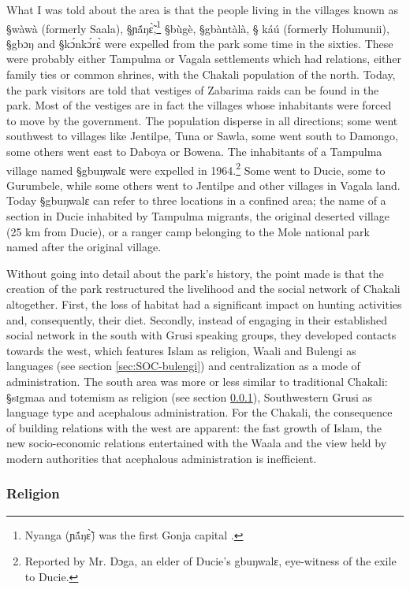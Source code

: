 What I was told about the area is that the people living in the villages
known as
{\S wàwà} (formerly Saala), {\S ɲã́ŋɛ̃̀},\footnote{Nyanga ({\F ɲã́ŋɛ̃̀})  was
the first Gonja capital \cite[121]{Wilk89}.} {\S bùgè}, {\S gbàntàlà},  {\S
káú} (formerly Holumunii), {\S gbɔŋ} and {\S kɔ́nkɔ́rɛ̀} were expelled from the
park some time  in the  sixties. These were probably either Tampulma
or Vagala settlements which had relations, either family ties or common
shrines, 
with the Chakali population of the north. Today, the park visitors  are
told that vestiges of Zabarima raids can be found in the park. Most of the
vestiges are in fact  the villages whose inhabitants were forced to move by the
 government. The population  disperse in all
directions; some went southwest
to villages like Jentilpe, Tuna or Sawla, some went south to Damongo, some
others went east to Daboya or Bowena.  The inhabitants of a Tampulma village
named {\S gbuŋwalɛ} were expelled  in 1964.\footnote{Reported by Mr. Dɔga, an
elder of Ducie's {\F gbuŋwalɛ}, eye-witness of the exile to Ducie.} Some  went
to Ducie, some  to Gurumbele, while some others went to Jentilpe
and other villages in Vagala land.  Today {\S gbuŋwalɛ} can refer to three
locations in a confined area;  the name of a  section in  Ducie inhabited by
Tampulma
migrants,  the original deserted village (25 km from Ducie), or  a ranger camp
belonging to the Mole national park named after the original village. 


Without going  into detail about the park’s history, the point made is that 
the creation of the park restructured the livelihood and the social network of
Chakali altogether. First,  the loss of habitat had a significant impact on
hunting activities and, consequently, their diet. Secondly,  instead of engaging
in their established social network in the south with Grusi speaking groups,
they developed contacts towards the  west, which features Islam as
religion, Waali and
Bulengi as languages (see section \ref{sec:SOC-bulengi}) and centralization as a
mode of administration. The south area was
more or less similar to  traditional Chakali: {\S sɪgmaa} and totemism as
religion (see section \ref{sec:SOC-religion}), Southwestern Grusi as language
type and acephalous administration. 
For the Chakali, the consequence of building relations with the west are
apparent: the fast growth of Islam, the new socio-economic relations
entertained
with the Waala and the view held by modern authorities that acephalous
administration is inefficient.


\subsubsection{Religion}
\label{sec:SOC-religion}

